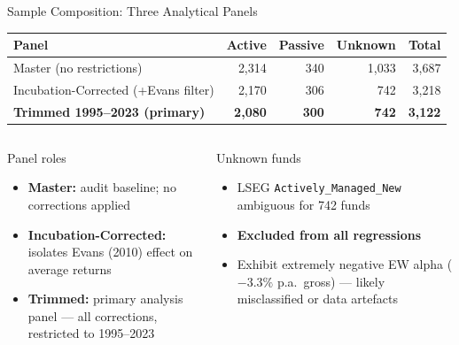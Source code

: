 \documentclass[aspectratio=169,10pt]{beamer}
\newcommand{\red}[1]{\textcolor{AlertRed}{\textbf{#1}}}
\begin{document}
\begin{frame}{Sample Composition: Three Analytical Panels}
\vspace{-2pt}
\begin{center}
\begin{tabular}{lrrrr}
\toprule
\textbf{Panel} & \textbf{Active} & \textbf{Passive} & \textbf{Unknown} & \textbf{Total}\\
\midrule
Master (no restrictions) & 2,314 & 340 & 1,033 & 3,687 \\
Incubation-Corrected (+Evans filter) & 2,170 & 306 & \phantom{0,}742 & 3,218 \\
\rowcolor{BUNavy!12}
\textbf{Trimmed 1995--2023 (primary)} & \textbf{2,080} & \textbf{300} & \textbf{\phantom{0,}742} & \textbf{3,122} \\
\bottomrule
\end{tabular}
\end{center}
\vspace{4pt}

\begin{columns}[T]
\begin{block}{Panel roles}
\begin{itemize}
  \item \textbf{Master:} audit baseline; no corrections applied
  \item \textbf{Incubation-Corrected:} isolates Evans (2010) effect on average returns
  \item \textbf{Trimmed:} primary analysis panel — all corrections, restricted to 1995–2023
\end{itemize}
\end{block}

\begin{block}{Unknown funds}
\begin{itemize}
  \item LSEG \texttt{Actively\_Managed\_New} ambiguous for 742 funds
  \item \red{Excluded from all regressions}
  \item Exhibit extremely negative EW alpha ($-3.3\%$ p.a.\ gross) — likely misclassified or data artefacts
\end{itemize}
\end{block}
\end{columns}
\end{frame}
\end{document}
